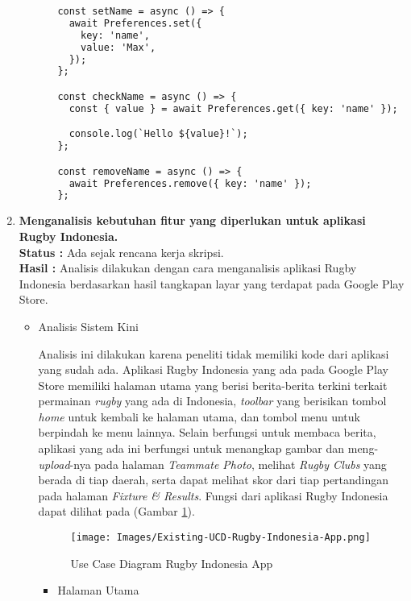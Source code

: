 \documentclass[a4paper,twoside]{article}
\begin{document}
\begin{enumerate}
\begin{itemize}
\begin{itemize}
\begin{lstlisting}[language=HTML, caption=Contoh Kode Plugin Preference, label=kode:preference-capacitor-example]
const setName = async () => {
  await Preferences.set({
    key: 'name',
    value: 'Max',
  });
};

const checkName = async () => {
  const { value } = await Preferences.get({ key: 'name' });

  console.log(`Hello ${value}!`);
};

const removeName = async () => {
  await Preferences.remove({ key: 'name' });
};
\end{lstlisting}

    \end{itemize}
\end{itemize}


		\item \textbf{Menganalisis kebutuhan fitur yang diperlukan untuk aplikasi Rugby Indonesia.}\\
		{\bf Status :} Ada sejak rencana kerja skripsi. \\
		{\bf Hasil :} Analisis dilakukan dengan cara menganalisis aplikasi Rugby Indonesia berdasarkan hasil tangkapan layar yang terdapat pada Google Play Store. 

  \begin{itemize}
      \item Analisis Sistem Kini

      Analisis ini dilakukan karena peneliti tidak memiliki kode dari aplikasi yang sudah ada. Aplikasi Rugby Indonesia yang ada pada Google Play Store memiliki halaman utama yang berisi berita-berita terkini terkait permainan \textit{rugby} yang ada di Indonesia, \textit{toolbar} yang berisikan tombol \textit{home} untuk kembali ke halaman utama, dan tombol menu untuk berpindah ke menu lainnya. Selain berfungsi untuk membaca berita, aplikasi yang ada ini berfungsi untuk menangkap gambar dan meng-\textit{upload}-nya pada halaman \textit{Teammate Photo}, melihat \textit{Rugby Clubs} yang berada di tiap daerah, serta dapat melihat skor dari tiap pertandingan pada halaman \textit{Fixture \& Results}. Fungsi dari aplikasi Rugby Indonesia dapat dilihat pada (Gambar \ref{fig:ucd-rugby-indonesia-app}).

\begin{figure} [H]
    \centering
    \texttt{[image: Images/Existing-UCD-Rugby-Indonesia-App.png]}
    \caption{Use Case Diagram Rugby Indonesia App}
    \label{fig:ucd-rugby-indonesia-app}
\end{figure}

\begin{itemize}
    \item Halaman Utama


\end{itemize}
\end{itemize}
\end{enumerate}
\end{document}
